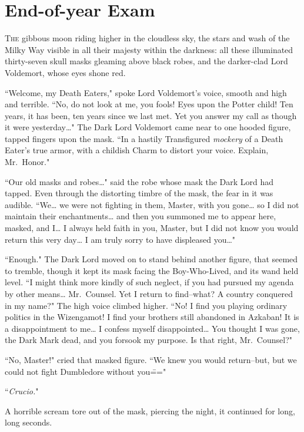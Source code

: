 \chapter{End-of-year Exam}

\lettrine{T}{he} gibbous moon riding higher in the cloudless sky, the stars and wash of the Milky Way visible in all their majesty within the darkness: all these illuminated thirty-seven skull masks gleaming above black robes, and the darker-clad Lord Voldemort, whose eyes shone red.

``Welcome, my Death Eaters," spoke Lord Voldemort's voice, smooth and high and terrible. ``No, do not look at me, you fools! Eyes upon the Potter child! Ten years, it has been, ten years since we last met. Yet you answer my call as though it were yesterday{\ldots}" The Dark Lord Voldemort came near to one hooded figure, tapped fingers upon the mask. ``In a hastily Transfigured \emph{mockery} of a Death Eater's true armor, with a childish Charm to distort your voice. Explain, Mr.~Honor."

``Our old masks and robes{\ldots}" said the robe whose mask the Dark Lord had tapped. Even through the distorting timbre of the mask, the fear in it was audible. ``We{\ldots} we were not fighting in them, Master, with you gone{\ldots} so I did not maintain their enchantments{\ldots} and then you summoned me to appear here, masked, and I{\ldots} I always held faith in you, Master, but I did not know you would return this very day{\ldots} I am truly sorry to have displeased you{\ldots}"

``Enough." The Dark Lord moved on to stand behind another figure, that seemed to tremble, though it kept its mask facing the Boy-Who-Lived, and its wand held level. ``I might think more kindly of such neglect, if you had pursued my agenda by other means{\ldots} Mr.~Counsel. Yet I return to find\---what? A country conquered in my name?" The high voice climbed higher. ``No! I find you playing ordinary politics in the Wizengamot! I find your brothers still abandoned in Azkaban! It is a disappointment to me{\ldots} I confess myself disappointed{\ldots} You thought I was gone, the Dark Mark dead, and you forsook my purpose. Is that right, Mr.~Counsel?"

``No, Master!" cried that masked figure. ``We knew you would return\---but, but we could not fight Dumbledore without you\==="

``\emph{Crucio.}"

A horrible scream tore out of the mask, piercing the night, it continued for long, long seconds.

